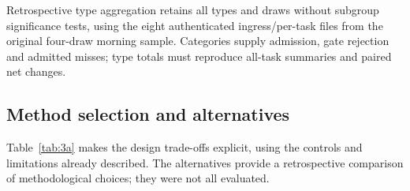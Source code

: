 \documentclass[12pt,a4paper]{article}
\begin{document}
Retrospective type aggregation retains all types and draws without subgroup significance tests, using the eight authenticated ingress/per-task files from the original four-draw morning sample. Categories supply admission, gate rejection and admitted misses; type totals must reproduce all-task summaries and paired net changes.

\FloatBarrier
\subsection{Method selection and alternatives}\label{sec:2.9}

Table~\ref{tab:3a} makes the design trade-offs explicit, using the controls and limitations already described. The alternatives provide a retrospective comparison of methodological choices; they were not all evaluated.
\end{document}
